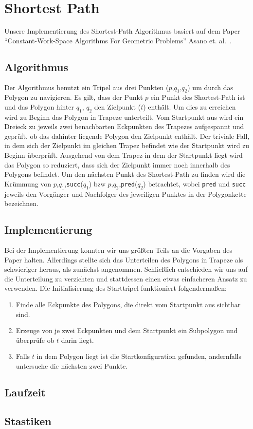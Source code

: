\section{Shortest Path}
	
  Unsere Implementierung des Shortest-Path Algorithmus basiert auf dem Paper
  \enquote{Constant-Work-Space Algorithms For Geometric Problems} Asano et.
  al.~\cite{asano11shortestpath}.

  \subsection{Algorithmus}

    Der Algorithmus benutzt ein Tripel aus drei Punkten ($p$,$q_1$,$q_2$) um
    durch das Polygon zu navigieren. Es gilt, dass der Punkt $p$ ein Punkt des
    Shortest-Path ist und das Polygon hinter $q_1$, $q_2$ den Zielpunkt ($t$)
    enthält. Um dies zu erreichen wird zu Beginn das Polygon in Trapeze
    unterteilt. Vom Startpunkt aus wird ein Dreieck zu jeweils zwei
    benachbarten Eckpunkten des Trapezes aufgespannt und geprüft, ob das
    dahinter liegende Polygon den Zielpunkt enthält. Der triviale Fall, in dem
    sich der Zielpunkt im gleichen Trapez befindet wie der Startpunkt wird zu
    Beginn überprüft. Ausgehend von dem Trapez in dem der Startpunkt liegt
    wird das Polygon so reduziert, dass sich der Zielpunkt immer noch
    innerhalb des Polygons befindet. Um den nächsten Punkt des Shortest-Path
    zu finden wird die Krümmung von $p$,$q_1$,\texttt{succ}($q_1$) bzw
    $p$,$q_2$,\texttt{pred}($q_2$) betrachtet, wobei \texttt{pred} und
    \texttt{succ} jeweils den Vorgänger und Nachfolger des jeweiligen Punktes
    in der Polygonkette bezeichnen.

  \subsection{Implementierung}

    Bei der Implementierung konnten wir uns größten Teils an die Vorgaben des
    Paper halten. Allerdings stellte sich das Unterteilen des Polygons in
    Trapeze als schwieriger heraus, als zunächst angenommen. Schließlich
    entschieden wir uns auf die Unterteilung zu verzichten und stattdessen
    einen etwas einfacheren Ansatz zu verwenden. Die Initialisierung des
    Starttripel funktioniert folgendermaßen:

    \begin{enumerate}
      \item Finde alle Eckpunkte des Polygons, die direkt vom Startpunkt aus 
            sichtbar sind.
      \item Erzeuge von je zwei Eckpunkten und dem Startpunkt ein Subpolygon 
            und überprüfe ob $t$ darin liegt.
      \item Falls $t$ in dem Polygon liegt ist die Startkonfiguration gefunden, 
            andernfalls untersuche die nächsten zwei Punkte.
    \end{enumerate}

  \subsection{Laufzeit}
  \subsection{Stastiken}